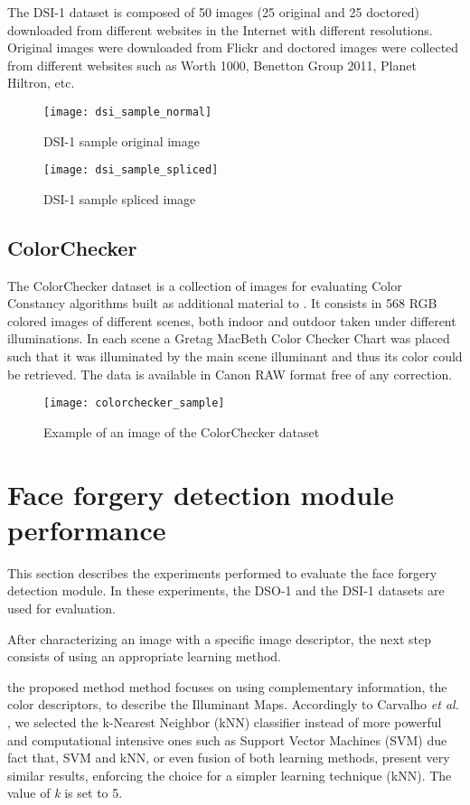 The DSI-1 dataset is composed of 50 images (25 original and 25 doctored) downloaded from different websites in the Internet with different resolutions. Original images were downloaded from Flickr and doctored images were collected from different websites such as Worth 1000, Benetton Group 2011, Planet Hiltron, etc.

\begin{figure}[!htb]
  \texttt{[image: dsi\_sample\_normal]}
  \caption{DSI-1 sample original image}\label{fig:dsioriginalimage}
\endminipage\hfill
{}
  \texttt{[image: dsi\_sample\_spliced]}
  \caption{DSI-1 sample spliced image}\label{fig:dsisplicedimage}
\endminipage
\end{figure}

\subsection{ColorChecker}

The ColorChecker dataset is a collection of images for evaluating Color Constancy algorithms built as additional material to \cite{gehler2008bayesian}. It consists in 568 RGB colored images of different scenes, both indoor and outdoor taken under different illuminations. In each scene a Gretag MacBeth Color Checker Chart was placed such that it was illuminated by the main scene illuminant and thus its color could be retrieved. The data is available in Canon RAW format free of any correction.

\begin{figure}[h!]
  \centering
    \texttt{[image: colorchecker\_sample]}
    \caption{Example of an image of the ColorChecker dataset}
    \label{fig:colorcheckersample}
\end{figure}

\section{Face forgery detection module performance}

This section describes the experiments performed to evaluate the face forgery detection module. In these experiments, the DSO-1 and the DSI-1 datasets are used for evaluation.

After characterizing an image with a specific image descriptor, the next step consists of using an appropriate learning method.

the proposed method method focuses on using complementary information, the color descriptors, to describe the Illuminant Maps. Accordingly to Carvalho \emph{et al. }\cite{carvalho2016illuminant}, we selected the k-Nearest Neighbor (kNN) classifier instead of more powerful and computational intensive ones such as Support Vector Machines (SVM) due fact that, SVM and kNN, or even fusion of both learning methods, present very similar results, enforcing the choice for a simpler learning technique (kNN)\cite{carvalho2016illuminant}. The value of \emph{k} is set to 5. 

